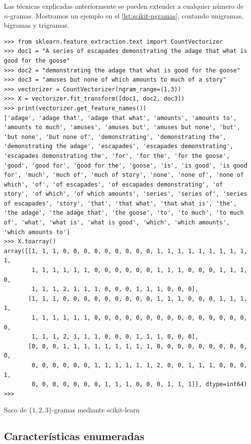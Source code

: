 Las técnicas explicadas anteriormente se pueden extender a cualquier número de $n$-gramas. Mostramos un ejemplo en el \autoref{lst:scikit-ngramas}, contando unigramas, bigramas y trigramas.

\begin{listing}[htbp]
\begin{verbatim}
>>> from sklearn.feature_extraction.text import CountVectorizer
>>> doc1 = "A series of escapades demonstrating the adage that what is good for the goose"
>>> doc2 = "demonstrating the adage that what is good for the goose"
>>> doc3 = "amuses but none of which amounts to much of a story"
>>> vectorizer = CountVectorizer(ngram_range=(1,3))
>>> X = vectorizer.fit_transform([doc1, doc2, doc3])
>>> print(vectorizer.get_feature_names())
['adage', 'adage that', 'adage that what', 'amounts', 'amounts to', 'amounts to much', 'amuses', 'amuses but', 'amuses but none', 'but', 'but none', 'but none of', 'demonstrating', 'demonstrating the', 'demonstrating the adage', 'escapades', 'escapades demonstrating', 'escapades demonstrating the', 'for', 'for the', 'for the goose', 'good', 'good for', 'good for the', 'goose', 'is', 'is good', 'is good for', 'much', 'much of', 'much of story', 'none', 'none of', 'none of which', 'of', 'of escapades', 'of escapades demonstrating', 'of story', 'of which', 'of which amounts', 'series', 'series of', 'series of escapades', 'story', 'that', 'that what', 'that what is', 'the', 'the adage', 'the adage that', 'the goose', 'to', 'to much', 'to much of', 'what', 'what is', 'what is good', 'which', 'which amounts', 'which amounts to']
>>> X.toarray()
array([[1, 1, 1, 0, 0, 0, 0, 0, 0, 0, 0, 0, 1, 1, 1, 1, 1, 1, 1, 1, 1, 1,
        1, 1, 1, 1, 1, 1, 0, 0, 0, 0, 0, 0, 1, 1, 1, 0, 0, 0, 1, 1, 1, 0,
        1, 1, 1, 2, 1, 1, 1, 0, 0, 0, 1, 1, 1, 0, 0, 0],
       [1, 1, 1, 0, 0, 0, 0, 0, 0, 0, 0, 0, 1, 1, 1, 0, 0, 0, 1, 1, 1, 1,
        1, 1, 1, 1, 1, 1, 0, 0, 0, 0, 0, 0, 0, 0, 0, 0, 0, 0, 0, 0, 0, 0,
        1, 1, 1, 2, 1, 1, 1, 0, 0, 0, 1, 1, 1, 0, 0, 0],
       [0, 0, 0, 1, 1, 1, 1, 1, 1, 1, 1, 1, 0, 0, 0, 0, 0, 0, 0, 0, 0, 0,
        0, 0, 0, 0, 0, 0, 1, 1, 1, 1, 1, 1, 2, 0, 0, 1, 1, 1, 0, 0, 0, 1,
        0, 0, 0, 0, 0, 0, 0, 1, 1, 1, 0, 0, 0, 1, 1, 1]], dtype=int64)
>>> 
\end{verbatim}
\caption{Saco de $\{1,2,3\}$-gramas mediante scikit-learn}
\label{lst:scikit-ngramas}
\end{listing}



\subsection{Características enumeradas}

